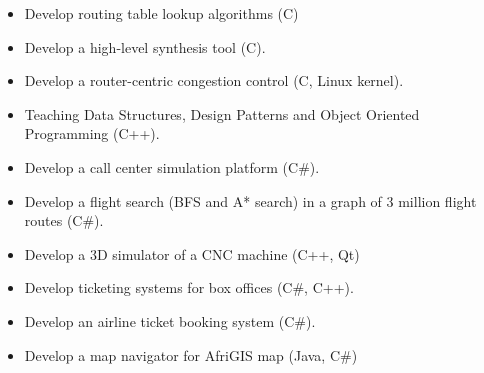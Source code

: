 \begin{itemize}
	\item Develop routing table lookup algorithms (C)
	\item Develop a high-level synthesis tool (C).
	\item Develop a router-centric congestion control (C, Linux kernel).
	\item Teaching Data Structures, Design Patterns and Object Oriented Programming (C++).
\end{itemize}

\divider

\begin{itemize}
	\item Develop a call center simulation platform (C\#).
\end{itemize}

\divider

\begin{itemize}
	\item Develop a flight search (BFS and A* search) in a graph of 3 million flight routes (C\#).
\end{itemize}

\divider

\begin{itemize}
	\item Develop a 3D simulator of a CNC machine (C++, Qt)
\end{itemize}

\divider

\begin{itemize}
	\item Develop ticketing systems for box offices (C\#, C++).
\end{itemize}

\divider

\begin{itemize}
	\item Develop an airline ticket booking system (C\#).
\end{itemize}


\divider

\begin{itemize}
	\item Develop a map navigator for AfriGIS map (Java, C\#)
\end{itemize}

\cvproject{}